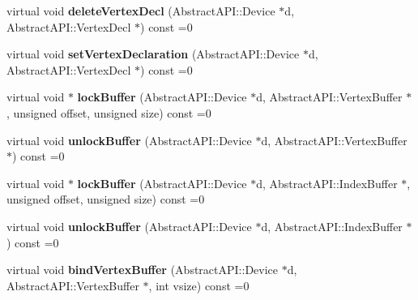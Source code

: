 \begin{DoxyCompactItemize}
\item 
\hypertarget{class_tempest_1_1_abstract_a_p_i_ae30afa9fe163d353e4a24d23e0ada367}{virtual void {\bfseries delete\+Vertex\+Decl} (Abstract\+A\+P\+I\+::\+Device $\ast$d, Abstract\+A\+P\+I\+::\+Vertex\+Decl $\ast$) const =0}\label{class_tempest_1_1_abstract_a_p_i_ae30afa9fe163d353e4a24d23e0ada367}

\item 
\hypertarget{class_tempest_1_1_abstract_a_p_i_acccef1d3855bd5f091948e2e6a542549}{virtual void {\bfseries set\+Vertex\+Declaration} (Abstract\+A\+P\+I\+::\+Device $\ast$d, Abstract\+A\+P\+I\+::\+Vertex\+Decl $\ast$) const =0}\label{class_tempest_1_1_abstract_a_p_i_acccef1d3855bd5f091948e2e6a542549}

\item 
\hypertarget{class_tempest_1_1_abstract_a_p_i_a55d9204dc4d2c52a412be643b6453bbe}{virtual void $\ast$ {\bfseries lock\+Buffer} (Abstract\+A\+P\+I\+::\+Device $\ast$d, Abstract\+A\+P\+I\+::\+Vertex\+Buffer $\ast$, unsigned offset, unsigned size) const =0}\label{class_tempest_1_1_abstract_a_p_i_a55d9204dc4d2c52a412be643b6453bbe}

\item 
\hypertarget{class_tempest_1_1_abstract_a_p_i_a3471f33086243e0321fc7476c8810f2c}{virtual void {\bfseries unlock\+Buffer} (Abstract\+A\+P\+I\+::\+Device $\ast$d, Abstract\+A\+P\+I\+::\+Vertex\+Buffer $\ast$) const =0}\label{class_tempest_1_1_abstract_a_p_i_a3471f33086243e0321fc7476c8810f2c}

\item 
\hypertarget{class_tempest_1_1_abstract_a_p_i_ac747d2c83a5083ff3469e8e650a31d43}{virtual void $\ast$ {\bfseries lock\+Buffer} (Abstract\+A\+P\+I\+::\+Device $\ast$d, Abstract\+A\+P\+I\+::\+Index\+Buffer $\ast$, unsigned offset, unsigned size) const =0}\label{class_tempest_1_1_abstract_a_p_i_ac747d2c83a5083ff3469e8e650a31d43}

\item 
\hypertarget{class_tempest_1_1_abstract_a_p_i_a0f16d9a4d885dfc4e6dfeb2bc1c9b1e6}{virtual void {\bfseries unlock\+Buffer} (Abstract\+A\+P\+I\+::\+Device $\ast$d, Abstract\+A\+P\+I\+::\+Index\+Buffer $\ast$) const =0}\label{class_tempest_1_1_abstract_a_p_i_a0f16d9a4d885dfc4e6dfeb2bc1c9b1e6}

\item 
\hypertarget{class_tempest_1_1_abstract_a_p_i_af9bec771be9a930e1d2ec3187d3cce52}{virtual void {\bfseries bind\+Vertex\+Buffer} (Abstract\+A\+P\+I\+::\+Device $\ast$d, Abstract\+A\+P\+I\+::\+Vertex\+Buffer $\ast$, int vsize) const =0}\label{class_tempest_1_1_abstract_a_p_i_af9bec771be9a930e1d2ec3187d3cce52}


\end{DoxyCompactItemize}
